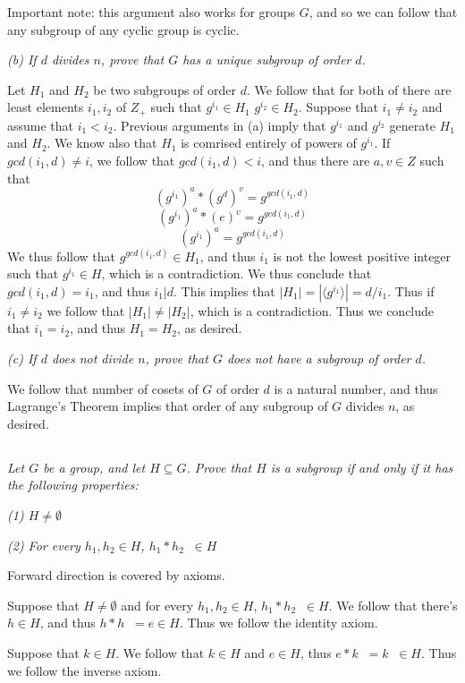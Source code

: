 \documentclass[11pt,oneside,titlepage]{book}
\DeclareMathOperator \inv {^{-1}}
\newcommand{\eangle}[1]{\langle #1 \rangle}
\begin{document}
Important note: this argument also works for groups $G$, and so we can follow that
any subgroup of any cyclic group is cyclic.

\textit{(b) If $d$ divides $n$, prove that $G$ has a unique subgroup of order $d$.}

Let $H_1$ and $H_2$ be two subgroups of order $d$. We follow that for
both of there are least elements $i_1, i_2$ of $Z_+$ such that
$g^{i_1} \in H_1$ $g^{i_2} \in H_2$. Suppose that $i_1 \neq i_2$ and
assume that $i_1 < i_2$.  Previous arguments in (a) imply that $g^{i_1}$ and
$g^{i_2}$ generate $H_1$ and $H_2$. We know also that $H_1$ is comrised entirely of
powers of $g^{i_1}$. If $gcd(i_1, d) \neq i$, we follow that $gcd(i_1, d) < i$,
and thus there are $a, v \in Z$ such that
$$(g^{i_1})^a * (g^{d})^v = g^{gcd(i_1, d)}$$
$$(g^{i_1})^a * (e)^v = g^{gcd(i_1, d)}$$
$$(g^{i_1})^a  = g^{gcd(i_1, d)}$$
We thus follow that $g^{gcd(i_1, d)} \in H_1$, and thus $i_1$ is not
the lowest positive integer such that $g^{i_1} \in H$, which is a
contradiction. We thus conclude that $gcd(i_1, d) = i_1$, and thus
$i_1 | d$. This implies that $|H_1| = |\eangle{g^{i_1}}| = d / i_1$.
Thus if $i_1 \neq i_2$ we follow that $|H_1| \neq |H_2|$, which is a
contradiction. Thus we conclude that $i_1 = i_2$, and thus $H_1 = H_2$,
as desired.

\textit{(c) If $d$ does not divide $n$, prove that $G$ does not have a subgroup of order $d$.}

We follow that number of cosets of $G$ of order $d$ is a natural number, and thus
Lagrange's Theorem implies that order of any subgroup of $G$ divides $n$, as desired.

\subsection{}

\textit{Let $G$ be a group, and let $H \subseteq G$. Prove that $H$ is a subgroup
  if and only if it has the following properties:}

\textit{(1) $H \neq \emptyset$}

\textit{(2) For every $h_1, h_2 \in H$, $h_1 * h_2 \inv \in H$}

Forward direction is covered by axioms.

Suppose that $H \neq \emptyset$ and for every $h_1, h_2 \in H$, $h_1 *
h_2 \inv \in H$. We follow that there's $h \in H$, and thus
$h * h\inv = e \in H$. Thus we follow the identity axiom.

Suppose that $k \in H$. We follow that $k \in H$ and $e \in H$, thus
$e * k\inv = k\inv \in H$. Thus we follow the inverse axiom.
\end{document}
